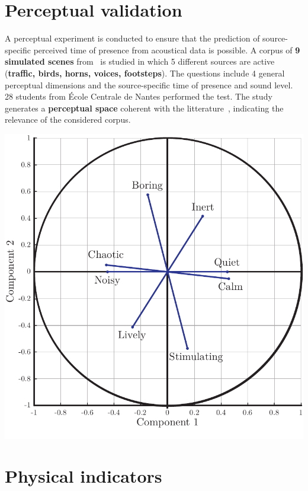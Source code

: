 \documentclass[a0,portrait]{a0poster}
\begin{document}
\begin{multicols}{2}
\section*{Perceptual validation}
 \begin{minipage}[c]{.48\linewidth}
A perceptual experiment is conducted to ensure that the prediction of source-specific perceived time of presence from acoustical data is possible. A corpus of \textbf{9 simulated scenes} from~\cite{gloaguen2017} is studied in which 5 different sources are active (\textbf{traffic, birds, horns, voices, footsteps}). The questions include 4 general perceptual dimensions and the source-specific time of presence and sound level. 28 students from \'Ecole Centrale de Nantes performed the test. The study generates a \textbf{perceptual space} coherent with the litterature~\cite{axelsson2010}, indicating the relevance of the considered corpus.
\end{minipage}
\hfill
 \begin{minipage}[c]{.48\linewidth}
\begin{center}\vspace{1cm}
\includegraphics[width=.8\linewidth]{pca.pdf}
\end{center}
\end{minipage}
\vspace{1cm}

\section*{Physical indicators}



\end{multicols}
\end{document}
